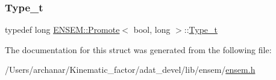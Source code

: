\subsubsection{\texorpdfstring{Type\_t}{Type\_t}\hspace{0.1cm}{\footnotesize\ttfamily [2/2]}}
{\footnotesize\ttfamily typedef long \mbox{\hyperlink{structENSEM_1_1Promote}{E\+N\+S\+E\+M\+::\+Promote}}$<$ bool, long $>$\+::\mbox{\hyperlink{structENSEM_1_1Promote_3_01bool_00_01long_01_4_a92d4af8adfcc1f69cde4f02b85f783c9}{Type\+\_\+t}}}



The documentation for this struct was generated from the following file\+:\begin{DoxyCompactItemize}
\item 
/\+Users/archanar/\+Kinematic\+\_\+factor/adat\+\_\+devel/lib/ensem/\mbox{\hyperlink{lib_2ensem_2ensem_8h}{ensem.\+h}}\end{DoxyCompactItemize}
